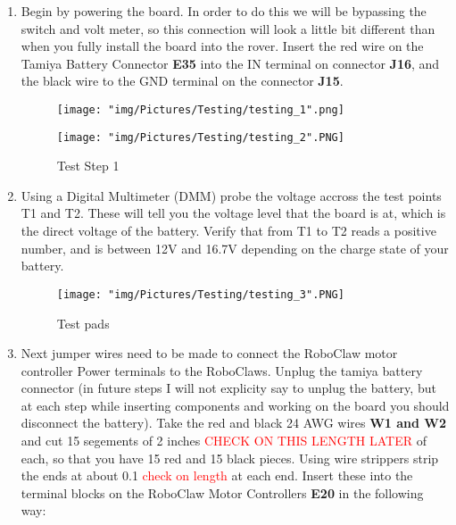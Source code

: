\documentclass[12pt]{article}
\begin{document}
\begin{enumerate}

\item Begin by powering the board. In order to do this we will be bypassing the switch and volt meter, so this connection will look a little bit different than when you fully install the board into the rover. Insert the red wire on the Tamiya Battery Connector \textbf{E35} into the IN terminal on connector \textbf{J16}, and the black wire to the GND terminal on the connector \textbf{J15}.

\begin{figure}[H]
  \centering
  \begin{minipage}[b]{0.45\textwidth}
    \texttt{[image: "img/Pictures/Testing/testing\_1".png]}
  \end{minipage}
  \hfill
  \begin{minipage}[b]{0.45\textwidth}
    \texttt{[image: "img/Pictures/Testing/testing\_2".PNG]}
  \end{minipage}
  \caption{Test Step 1}
  \label{test_1}
\end{figure}

\item Using a Digital Multimeter (DMM) probe the voltage accross the test points T1 and T2. These will tell you the voltage level that the board is at, which is the direct voltage of the battery. Verify that from T1 to T2 reads a positive number, and is between 12V and 16.7V depending on the charge state of your battery. 

\begin{figure}[H]
  \centering
    \texttt{[image: "img/Pictures/Testing/testing\_3".PNG]}
  \caption{Test pads}
  \label{test_pads_1}
\end{figure}

\item Next jumper wires need to be made to connect the RoboClaw motor controller Power terminals to the RoboClaws. Unplug the tamiya battery connector (in future steps I will not explicity say to unplug the battery, but at each step while inserting components and working on the board you should disconnect the battery). Take the red and black 24 AWG wires \textbf{W1 and W2} and cut 15 segements of 2 inches \textcolor{red}{CHECK ON THIS LENGTH LATER} of each, so that you have 15 red and 15 black pieces. Using wire strippers strip the ends at about 0.1 \textcolor{red}{check on length} at each end. Insert these into the terminal blocks on the RoboClaw Motor Controllers \textbf{E20} in the following way:


\end{enumerate}
\end{document}
